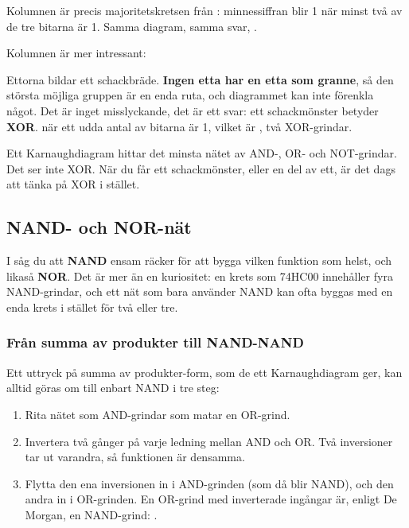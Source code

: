 \noindent Kolumnen  är precis majoritetskretsen från : minnessiffran blir 1
när minst två av de tre bitarna är 1. Samma diagram, samma svar, .

Kolumnen  är mer intressant:


\noindent Ettorna bildar ett schackbräde. \textbf{Ingen etta har en etta som granne}, så den största
möjliga gruppen är en enda ruta, och diagrammet kan inte förenkla något. Det är inget misslyckande,
det är ett svar: ett schackmönster betyder \textbf{XOR}.  när ett udda antal av bitarna
är 1, vilket är , två XOR-grindar.

Ett Karnaughdiagram hittar det minsta nätet av AND-, OR- och NOT-grindar. Det ser inte XOR. När du
får ett schackmönster, eller en del av ett, är det dags att tänka på XOR i stället.

\subsection{NAND- och NOR-nät}
\label{c4:a9}
I  såg du att \textbf{NAND} ensam räcker för att bygga vilken funktion som helst, och
likaså \textbf{NOR}. Det är mer än en kuriositet: en krets som 74HC00 innehåller fyra NAND-grindar,
och ett nät som bara använder NAND kan ofta byggas med en enda krets i stället för två eller tre.

\subsubsection{Från summa av produkter till NAND-NAND}
Ett uttryck på summa av produkter-form, som de ett Karnaughdiagram ger, kan alltid göras om till
enbart NAND i tre steg:
\begin{enumerate}
  \item Rita nätet som AND-grindar som matar en OR-grind.
  \item Invertera två gånger på varje ledning mellan AND och OR. Två inversioner tar ut varandra, så
    funktionen är densamma.
  \item Flytta den ena inversionen in i AND-grinden (som då blir NAND), och den andra in i
    OR-grinden. En OR-grind med inverterade ingångar är, enligt De Morgan, en NAND-grind:
    .
\end{enumerate}


